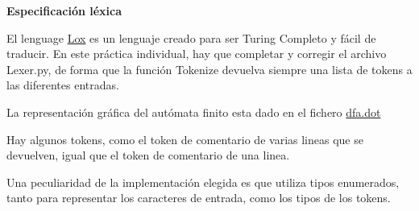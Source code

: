 
\author{Helmut Krauser}
\date{\today}
\title{}


\vspace{5mm}\centerline{\large\bf Especificación léxica}\vspace{5mm}
\label{sec:org7b57a99}

El lenguage \href{https://craftinginterpreters.com/the-lox-language.html}{Lox} es un lenguaje creado para ser Turing Completo y fácil de traducir.
En este práctica individual, hay que completar y corregir el archivo Lexer.py, de forma que la 
función Tokenize devuelva siempre una lista de tokens a las diferentes entradas.

La representación gráfica del autómata finito esta dado en el fichero \href{./dfa.dot}{dfa.dot}

\label{sec:org3ead4c7}


Hay algunos tokens, como el token de comentario de varias lineas que se devuelven, igual que el token de comentario de una linea.

\label{sec:org69a3e2c}



Una peculiaridad de la implementación elegida es que utiliza tipos enumerados, tanto para representar los caracteres de entrada, como los tipos de los tokens.

\label{sec:orga093405}

